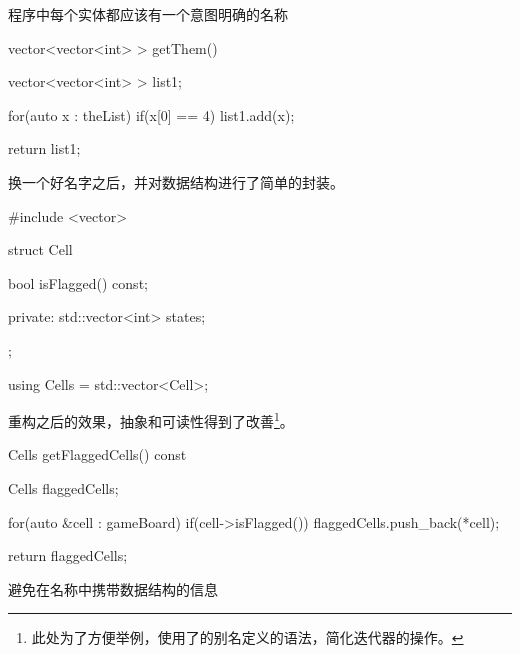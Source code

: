 \begin{content}
\begin{regulation}
程序中每个实体都应该有一个意图明确的名称
\end{regulation}

\begin{leftbar}
\begin{c++}
vector<vector<int> > getThem() 
{
    vector<vector<int> > list1;
    
    for(auto x : theList)
    {
        if(x[0] == 4)
        {   
            list1.add(x);
        }
    }
    
    return list1;
}
\end{c++}
\end{leftbar}

\begin{enum}
\end{enum}

换一个好名字之后，并对数据结构进行了简单的封装。

\begin{leftbar}
\begin{c++}
#include <vector>

struct Cell
{
    bool isFlagged() const;

private:
    std::vector<int> states;
};

using Cells = std::vector<Cell>;

\end{c++}
\end{leftbar}

重构之后的效果，抽象和可读性得到了改善\footnote{此处为了方便举例，使用了\cpp{}的别名定义的语法，简化迭代器的操作。}。

\begin{leftbar}
\begin{c++}
Cells getFlaggedCells() const
{
    Cells flaggedCells;

    for(auto &cell : gameBoard)
    { 
        if(cell->isFlagged())
        {
            flaggedCells.push_back(*cell);
        }
    }

    return flaggedCells;
}
\end{c++}
\end{leftbar}

\begin{regulation}
避免在名称中携带数据结构的信息
\end{regulation}


\end{content}
